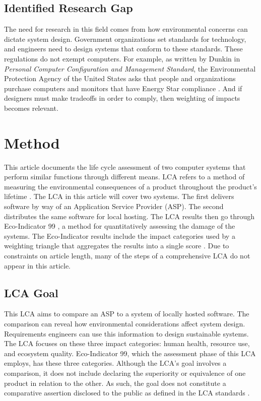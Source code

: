 \documentclass[final,journal,10pt,letterpaper,oneside,twocolumn,compsoc]%
{IEEEtran}
\begin{document}
\subsection{Identified Research Gap}
The need for research in this field comes from how environmental concerns can
dictate system design. Government organizations set standards for technology,
and
engineers need to design systems that conform to these standards. These
regulations do not exempt computers. For example, as written by Dunkin in
\textit{Personal Computer Configuration and Management Standard}, the
Environmental Protection
Agency of the United States asks that people and organizations purchase
computers and monitors that have Energy Star
compliance \cite{epa}. And if designers must make
tradeoffs in order to comply, then weighting of impacts becomes relevant. 

\section{Method}
This article documents the life cycle assessment of two computer systems
that perform similar functions through different means. LCA refers to a method
of measuring the environmental consequences of a product throughout the
product's
lifetime \cite{14040} \cite{14044}. The LCA in this article will cover two
systems. The first
delivers software by way of an Application Service Provider (ASP). The
second distributes the same software for local hosting. The LCA results then go
through Eco-Indicator 99 \cite{pre}, a method for quantitatively assessing the
damage of the systems. The Eco-Indicator
results include the impact categories used by a weighting triangle that
aggregates the results into a single score \cite{triangle}. Due to constraints
on article length, many of the steps of a comprehensive LCA do not appear in
this article.

\subsection{LCA Goal}
This LCA aims to compare an ASP to a system of
locally hosted software. The comparison can reveal how environmental
considerations affect system design. Requirements engineers can use this
information to design sustainable systems. The LCA focuses
on these three impact categories: human health, resource use, and ecosystem
quality. Eco-Indicator 99, which the assessment phase of this LCA  employs,
has these three categories. Although the LCA's goal involves a comparison, it
does not include declaring the superiority or equivalence of one product in
relation to the other. As such, the goal
does not constitute a comparative assertion disclosed to the public as defined
in the LCA standards \cite{lca}.
\end{document}
